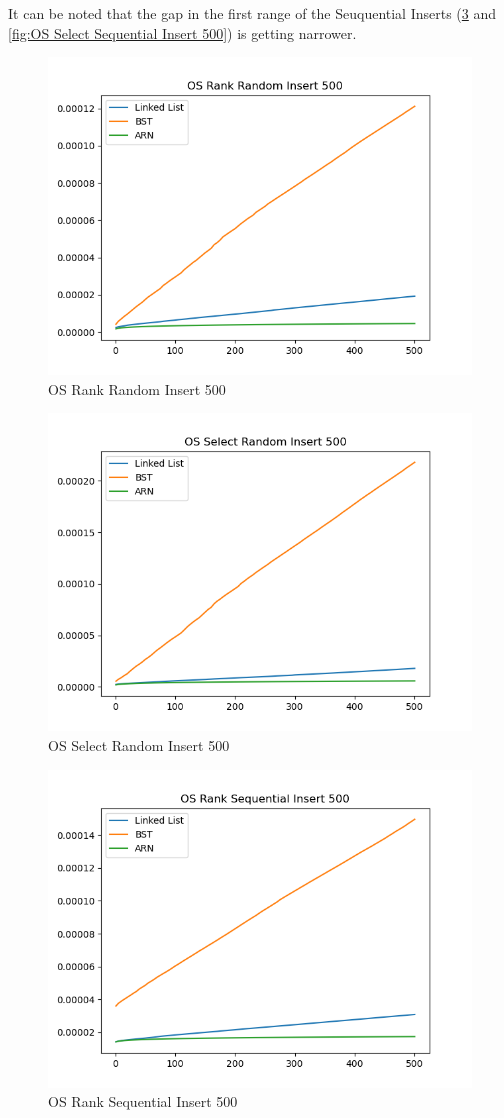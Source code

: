 \documentclass[11pt]{article}
\begin{document}
It can be noted that the gap in the first range of the Seuquential Inserts (\ref{fig:OS Rank Sequential Insert 500} and \ref{fig:OS Select Sequential Insert 500}) is getting narrower.

 \begin{figure}[H]
  \centering
  \includegraphics[width=0.8\linewidth]{Images/500/OS Rank Random Insert 500.png}
  \caption{OS Rank Random Insert 500 }
  \label{fig:OS Rank Random Insert 500}
\end{figure}
 \begin{figure}[H]
  \centering
  \includegraphics[width=0.8\linewidth]{Images/500/OS Select Random Insert 500.png}
  \caption{OS Select Random Insert 500 }
  \label{fig:OS Select Random Insert 500}
\end{figure}
 \begin{figure}[H]
  \centering
  \includegraphics[width=0.8\linewidth]{Images/500/OS Rank Sequential Insert 500.png}
  \caption{OS Rank Sequential Insert 500 }
  \label{fig:OS Rank Sequential Insert 500}
\end{figure}
\end{document}
